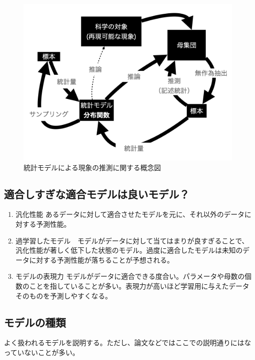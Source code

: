 \begin{figure}
 \begin{center}
  \includegraphics[bb=0 0 1024 768,width=15cm]{./image/01_/conceptual_diagram/conceptual_diagram.002.png}
  \caption{統計モデルによる現象の推測に関する概念図}
  \label{fig:conceptual_diagram_statistics}
 \end{center}
\end{figure}




\subsection{適合しすぎな適合モデルは良いモデル？}%

\begin{enumerate}
 \item 汎化性能 あるデータに対して適合させたモデルを元に、それ以外のデータに対する予測性能。
 \item 過学習したモデル　モデルがデータに対して当てはまりが良すぎることで、汎化性能が著しく低下した状態のモデル。過度に適合したモデルは未知のデータに対する予測性能が落ちることが予想される。
 \item モデルの表現力 モデルがデータに適合できる度合い。パラメータや母数の個数のことを指していることが多い。表現力が高いほど学習用に与えたデータそのものを予測しやすくなる。
\end{enumerate}

\subsection{モデルの種類}
よく扱われるモデルを説明する。ただし、論文などではここでの説明通りにはなっていないことが多い。

